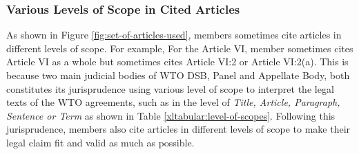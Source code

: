 \subsubsection{Various Levels of Scope in Cited Articles}
As shown in Figure \ref{fig:set-of-articles-used}, 
members sometimes
cite articles in different levels of scope. For example, 
For the Article VI, member sometimes cites
Article VI as a whole but sometimes cites
Article VI:2 or Article VI:2(a).
This is because two main judicial bodies of WTO DSB, Panel and Appellate Body, 
both constitutes its jurisprudence using
various level of scope to interpret the legal texts of the WTO agreements,
such as in the level of \textit{Title, Article, Paragraph, Sentence or Term} as shown in Table {\ref{xltabular:level-of-scopes}}. 
Following this jurisprudence, members also cite articles in different levels of scope to 
make their legal claim fit and valid as much as possible.\\


